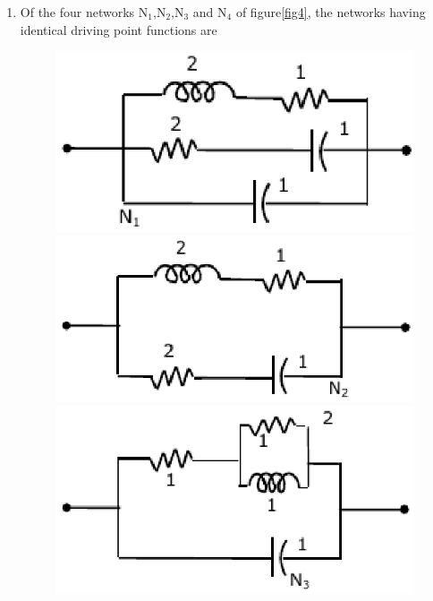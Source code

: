 \documentclass[journal,12pt,twocolumn]{IEEEtran}
\begin{document}
\begin{enumerate}
\item Of the four networks N$_{1}$,N$_{2}$,N$_{3}$ and N$_{4}$ of figure\ref{fig4}, the networks having identical
driving point functions are
\begin{enumerate}
\begin{figure}[!h]

\includegraphics[scale=0.5]{./figs/fig4a.eps}
\includegraphics[scale=0.5]{./figs/fig4b.eps}
\includegraphics[scale=0.5]{./figs/fig4c.eps}

\end{figure}
\end{enumerate}
\end{enumerate}
\end{document}
